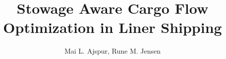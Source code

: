 

\title{Stowage Aware Cargo Flow Optimization in Liner Shipping}
\author{Mai L. Ajspur, Rune M. Jensen}
\maketitle



